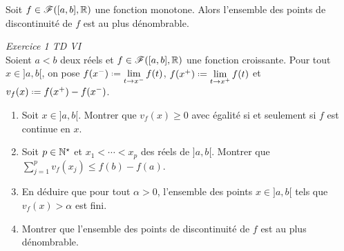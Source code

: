 \begin{tcolorbox}
    Soit $f \in \mathscr{F}([a, b], \mathbb{R})$ une fonction monotone. Alors l'ensemble des points de discontinuité de $f$ est au plus dénombrable. 
\end{tcolorbox}

\begin{exercice}
    \emph{Exercice 1 TD VI} \\
    Soient $a < b$ deux réels et $f \in \mathscr{F}([a, b], \mathbb{R})$ une fonction croissante. Pour tout $x \in ]a, b[$, on pose $f(x^-) \defeq \lim\limits_{t \to x^-} f(t)$, $f(x^+) \defeq \lim\limits_{t \to x^+} f(t)$ et $v_f(x) \defeq f(x^+)-f(x^-)$.
    \begin{enumerate}
        \item Soit $x \in ]a, b[$. Montrer que $v_f(x) \geqslant 0$ avec égalité si et seulement si $f$ est continue en $x$.
        \item Soit $p \in \mathbb{N}^\star$ et $x_1 < \cdots < x_p$ des réels de $]a, b[$. Montrer que $\sum\limits_{j=1}^p v_f(x_j) \leqslant f(b)-f(a)$.
        \item En déduire que pour tout $\alpha > 0$, l'ensemble des points $x \in ]a, b[$ tels que $v_f(x) > \alpha$ est fini. 
        \item Montrer que l'ensemble des points de discontinuité de $f$ est au plus dénombrable. 
    \end{enumerate}
\end{exercice}

